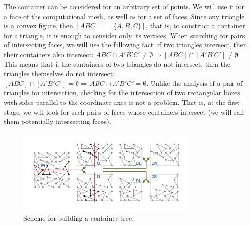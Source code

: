 \documentclass[
11pt,%
tightenlines,%
twoside,%
onecolumn,%
nofloats,%
nobibnotes,%
nofootinbib,%
superscriptaddress,%
noshowpacs,%
centertags]%
{revtex4-2}
\begin{document}
The container can be considered for an arbitrary set of points.
We will use it for a face of the computational mesh, as well as for a set of faces.
Since any triangle is a convex figure, then $[ABC] = [\{A, B, C\}]$, that is, to construct a container for a triangle, it is enough to consider only its vertices.
When searching for pairs of intersecting faces, we will use the following fact: if two triangles intersect, then their containers also intersect: $ABC \cap A'B'C' \ne \emptyset \Rightarrow [ABC] \cap [A'B'C'] \ne\emptyset$.
This means that if the containers of two triangles do not
intersect, then the triangles themselves do not intersect: $[ABC]
\cap [A'B'C'] = \emptyset \Rightarrow ABC \cap A'B'C' = \emptyset$.
Unlike the analysis of a pair of triangles for intersection,
checking for  the intersection of two rectangular boxes with sides
parallel to the coordinate axes is not a problem.
That is, at the first stage, we will look for such pairs of faces
whose  containers intersect (we will call them potentially
intersecting faces).

\begin{figure}[h]
\includegraphics[width=0.8\textwidth]{pics/pic_box_size.pdf}
\caption{Scheme for building a container tree.}\label{fig:pic_box}
\end{figure}
\end{document}
